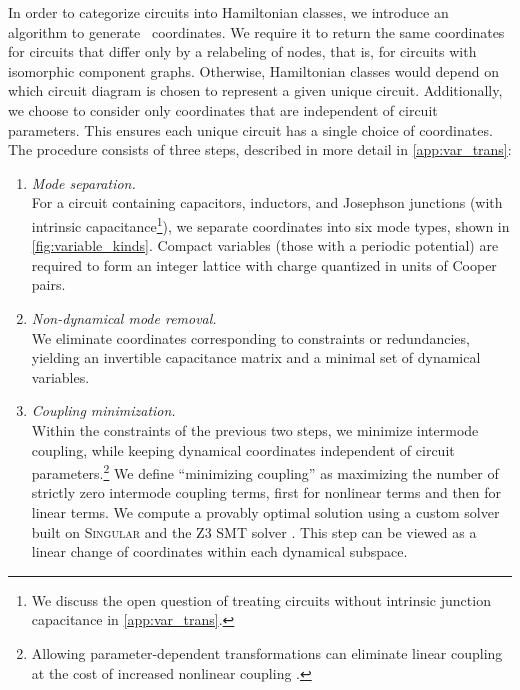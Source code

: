 In order to categorize circuits into Hamiltonian classes, we introduce an algorithm to generate \canonical~coordinates. We require it to return the same coordinates for circuits that differ only by a relabeling of nodes, that is, for circuits with isomorphic component graphs. Otherwise, Hamiltonian classes would depend on which circuit diagram is chosen to represent a given unique circuit. Additionally, we choose to consider only coordinates that are independent of circuit parameters. This ensures each unique circuit has a single choice of coordinates. The procedure consists of three steps, described in more detail in \cref{app:var_trans}:

\begin{enumerate}
    \item {\em Mode separation.} \\  For a circuit containing capacitors, inductors, and Josephson junctions (with intrinsic capacitance\footnote{We discuss the open question of treating circuits without intrinsic junction capacitance in \cref{app:var_trans}.}), we separate coordinates into six mode types, shown in \cref{fig:variable_kinds}.
    Compact variables (those with a periodic potential) are required to form an integer lattice with charge quantized in units of Cooper pairs.
    \item {\em Non-dynamical mode removal.} \\ We eliminate coordinates corresponding to constraints or redundancies, yielding an invertible capacitance matrix and a minimal set of dynamical variables.
    \item {\em Coupling minimization.} \\ Within the constraints of the previous two steps, we minimize intermode coupling, while keeping dynamical coordinates independent of circuit parameters.\footnote{Allowing parameter-dependent transformations can eliminate linear coupling at the cost of increased nonlinear coupling \cite{rajabzadehAnalysisArbitrarySuperconducting2023}.} We define ``minimizing coupling'' as maximizing the number of strictly zero intermode coupling terms, first for nonlinear terms and then for linear terms.
    We compute a provably optimal solution using a custom solver built on \textsc{Singular} \cite{Singular_2024} and the \textsc{Z3} SMT solver \cite{DeMouraBjornerZ3_2008}. This step can be viewed as a linear change of coordinates within each dynamical subspace.
\end{enumerate}
 



